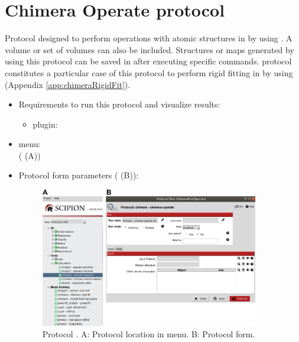 \section{Chimera Operate protocol}
\label{app:chimeraOperate}%

Protocol designed to perform operations with atomic structures in \scipion by using \chimera. A volume or set of volumes can also be included. Structures or maps generated by using this protocol can be saved in \scipion after executing specific \chimera commands. \chimera {} protocol constitutes a particular case of this protocol to perform rigid fitting in \scipion by using \chimera (Appendix \ref{app:chimeraRigidFit}).

 \begin{itemize}
  \item Requirements to run this protocol and visualize results:
    \begin{itemize}
        \item \scipion plugin: 
    \end{itemize}
  \item \scipion menu:\\
    ( (A))
  
  \item Protocol form parameters ( (B)):
  
    \begin{figure}[H]
     \centering 
     \captionsetup{width=.7\linewidth} 
     \includegraphics[width=0.90\textwidth]{Images_appendix/Fig117.pdf}
     \caption{Protocol . A: Protocol location in \scipion menu. B: Protocol form.}
     \label{fig:app_protocol_chimera_2}
    \end{figure}
    

\end{itemize}
